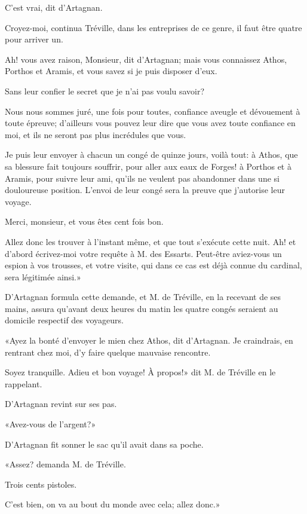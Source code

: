 \speak  C'est vrai, dit d'Artagnan. 

\speak  Croyez-moi, continua Tréville, dans les entreprises de ce genre, il faut être quatre pour arriver un. 

\speak  Ah! vous avez raison, Monsieur, dit d'Artagnan; mais vous connaissez Athos, Porthos et Aramis, et vous savez si je puis disposer d'eux. 

\speak  Sans leur confier le secret que je n'ai pas voulu savoir? 

\speak  Nous nous sommes juré, une fois pour toutes, confiance aveugle et dévouement à toute épreuve; d'ailleurs vous pouvez leur dire que vous avez toute confiance en moi, et ils ne seront pas plus incrédules que vous. 

\speak  Je puis leur envoyer à chacun un congé de quinze jours, voilà tout: à Athos, que sa blessure fait toujours souffrir, pour aller aux eaux de Forges! à Porthos et à Aramis, pour suivre leur ami, qu'ils ne veulent pas abandonner dans une si douloureuse position. L'envoi de leur congé sera la preuve que j'autorise leur voyage. 

\speak  Merci, monsieur, et vous êtes cent fois bon. 

\speak  Allez donc les trouver à l'instant même, et que tout s'exécute cette nuit. Ah! et d'abord écrivez-moi votre requête à M. des Essarts. Peut-être aviez-vous un espion à vos trousses, et votre visite, qui dans ce cas est déjà connue du cardinal, sera légitimée ainsi.» 

D'Artagnan formula cette demande, et M. de Tréville, en la recevant de ses mains, assura qu'avant deux heures du matin les quatre congés seraient au domicile respectif des voyageurs. 

«Ayez la bonté d'envoyer le mien chez Athos, dit d'Artagnan. Je craindrais, en rentrant chez moi, d'y faire quelque mauvaise rencontre. 

\speak  Soyez tranquille. Adieu et bon voyage! À propos!» dit M. de Tréville en le rappelant. 

D'Artagnan revint sur ses pas. 

«Avez-vous de l'argent?» 

D'Artagnan fit sonner le sac qu'il avait dans sa poche. 

«Assez? demanda M. de Tréville. 

\speak  Trois cents pistoles. 

\speak  C'est bien, on va au bout du monde avec cela; allez donc.» 

